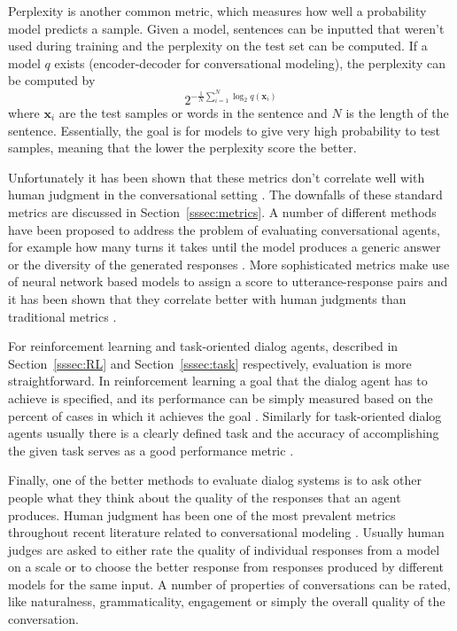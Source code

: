 \documentclass[12pt]{article}
\begin{document}
Perplexity \cite{Manning:1999} is another common metric, which measures how well a probability model predicts a sample. Given a model, sentences can be inputted that weren't used during training and the perplexity on the test set can be computed. If a model \(q\) exists (encoder-decoder for conversational modeling), the perplexity can be computed by
\begin{equation}
2^{-\frac{1}{N}\sum_{i=1}^{N}\log_2{q(\bm{x}_i)}}
\end{equation}
where \(\bm{x}_i\) are the test samples or words in the sentence and \(N\) is the length of the sentence. Essentially, the goal is for models to give very high probability to test samples, meaning that the lower the perplexity score the better.

Unfortunately it has been shown that these metrics don't correlate well with human judgment in the conversational setting \cite{Liu:2016}. The downfalls of these standard metrics are discussed in Section~\ref{sssec:metrics}. A number of different methods have been proposed to address the problem of evaluating conversational agents, for example how many turns it takes until the model produces a generic answer \cite{Zhao:2017,Li_RL:2016} or the diversity of the generated responses \cite{Li_RL:2016}. More sophisticated metrics make use of neural network based models to assign a score to utterance-response pairs and it has been shown that they correlate better with human judgments than traditional metrics \cite{Lowe:2017,Tao:2017}.

For reinforcement learning and task-oriented dialog agents, described in Section~\ref{sssec:RL} and Section~\ref{sssec:task} respectively, evaluation is more straightforward. In reinforcement learning a goal that the dialog agent has to achieve is specified, and its performance can be simply measured based on the percent of cases in which it achieves the goal \cite{Li_adversarial:2017,Havrylov:2017}. Similarly for task-oriented dialog agents usually there is a clearly defined task and the accuracy of accomplishing the given task serves as a good performance metric \cite{Joshi:2017,Zhao:2017,Li_HIL:2016}.

Finally, one of the better methods to evaluate dialog systems is to ask other people what they think about the quality of the responses that an agent produces. Human judgment has been one of the most prevalent metrics throughout recent literature related to conversational modeling \cite{Shang:2015,Vinyals:2015,Zhou:2017,Li_RL:2016,Zhao:2017,Li_RL:2016,Li:2015}. Usually human judges are asked to either rate the quality of individual responses from a model on a scale or to choose the better response from responses produced by different models for the same input. A number of properties of conversations can be rated, like naturalness, grammaticality, engagement or simply the overall quality of the conversation.
\end{document}
